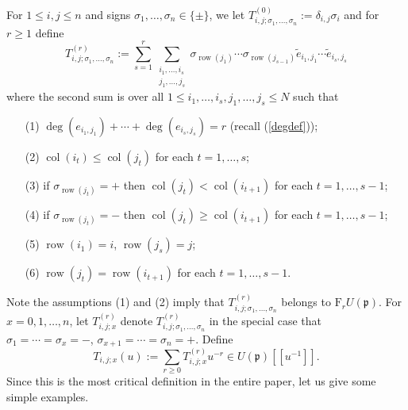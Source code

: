 \documentclass[twoside,12pt,reqno]{amsart}
\def\row{\operatorname{row}}
\def\col{\operatorname{col}}
\def\F{\mathrm{F}}
\begin{document}
For $1 \leq i,j \leq n$ and signs
$\sigma_1,\dots,\sigma_n \in \{\pm\}$,
we let
$T_{i,j;\sigma_1,\dots,\sigma_n}^{(0)} := \delta_{i,j} \sigma_i$
and for $r \geq 1$ define
\begin{equation}\label{thedef}
T_{i,j;\sigma_1,\dots,\sigma_n}^{(r)}
:=
\sum_{s = 1}^r
\sum_{\substack{i_1,\dots,i_s\\j_1,\dots,j_s}}
\sigma_{\row(j_1)} \cdots \sigma_{\row(j_{s-1})}
 \tilde e_{i_1,j_1} \cdots \tilde e_{i_s,j_s}
\end{equation}
where the second sum is over all $1 \leq i_1,\dots,i_s,j_1,\dots,j_s \leq N$
such that
\begin{itemize}
\item[(1)] $\deg(e_{i_1,j_1})+\cdots+\deg(e_{i_s,j_s}) = r$ (recall (\ref{degdef}));
\item[(2)] $\col(i_t) \leq \col(j_t)$ for each $t=1,\dots,s$;
\item[(3)] if $\sigma_{\row(j_t)} = +$ then
$\col(j_t) < \col(i_{t+1})$ for each
$t=1,\dots,s-1$;
\item[(4)]
if $\sigma_{\row(j_t)} = -$ then $\col(j_t) \geq \col(i_{t+1})$
for each
$t=1,\dots,s-1$;
\item[(5)] $\row(i_1)=i$, $\row(j_s) = j$;
\item[(6)]
$\row(j_t)=\row(i_{t+1})$ for each $t=1,\dots,s-1$.
\end{itemize}
Note the assumptions (1) and (2) imply
that $T_{i,j;\sigma_1,\dots,\sigma_n}^{(r)}$
belongs to $\F_r U(\mathfrak p)$.
For $x=0,1,\dots,n$, let $T_{i,j;x}^{(r)}$
denote $T_{i,j;\sigma_1,\dots,\sigma_n}^{(r)}$ 
in the special case that $\sigma_1=\cdots=\sigma_x = -$,
$\sigma_{x+1}=\cdots=\sigma_n = +$.
Define
\begin{equation}\label{earlier}
T_{i,j;x}(u) := \sum_{r \geq 0} T_{i,j;x}^{(r)} u^{-r}
\in U(\mathfrak p) [[u^{-1}]].
\end{equation}
Since this is the most critical definition in the entire paper,
let us give some simple examples.
\end{document}
